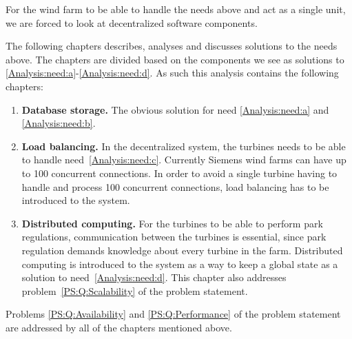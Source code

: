 For the wind farm to be able to handle the needs above and act as a single unit, we are forced to look at decentralized software components. 

The following chapters describes, analyses and discusses solutions to the needs above. The chapters are divided based on the components we see as solutions to \ref{Analysis:need:a}-\ref{Analysis:need:d}. As such this analysis contains the following chapters:

\begin{enumerate}[label=2.\arabic*]
\item{\textbf{Database storage.}} The obvious solution for need \ref{Analysis:need:a} and \ref{Analysis:need:b}.
\item{\textbf{Load balancing.}} In the decentralized system, the turbines needs to be able to handle need~\ref{Analysis:need:c}. Currently Siemens wind farms can have up to 100 concurrent connections. In order to avoid a single turbine having to handle and process 100 concurrent connections, load balancing has to be introduced to the system.
\item{\textbf{Distributed computing.}} For the turbines to be able to perform park regulations, communication between the turbines is essential, since park regulation demands knowledge about every turbine in the farm. Distributed computing is introduced to the system as a way to keep a global state as a solution to need~\ref{Analysis:need:d}. This chapter also addresses problem~\ref{PS:Q:Scalability} of the problem statement.
\end{enumerate}

Problems \ref{PS:Q:Availability} and \ref{PS:Q:Performance} of the problem statement are addressed by all of the chapters mentioned above.

%
%
%
%
%
%




